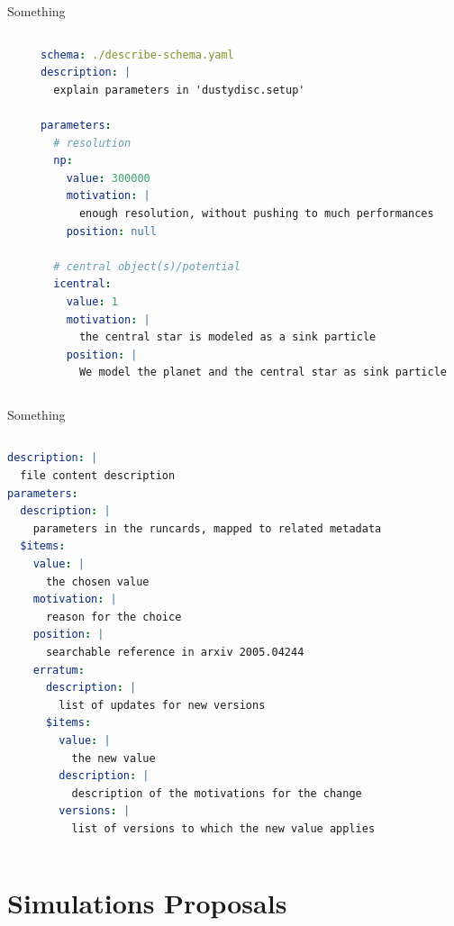 \documentclass[9pt]{beamer}
\begin{document}
\begin{frame}[fragile]{Something}
    \begin{columns}
        \begin{column}{0.5\textwidth}
        \end{column}
        \begin{column}{0.5\textwidth}
            \begin{lstlisting}[style=mystyle, language=yaml, breaklines=true]
schema: ./describe-schema.yaml
description: |
  explain parameters in 'dustydisc.setup'

parameters:
  # resolution
  np:
    value: 300000
    motivation: |
      enough resolution, without pushing to much performances
    position: null

  # central object(s)/potential
  icentral:
    value: 1
    motivation: |
      the central star is modeled as a sink particle
    position: |
      We model the planet and the central star as sink particle
\end{lstlisting}
        \end{column}
    \end{columns}
\end{frame}

\begin{frame}[fragile]{Something}
    \begin{columns}
        \begin{column}{0.5\textwidth}
            \begin{lstlisting}[language=yaml, style=mystyle, breaklines=true]
description: |
  file content description
parameters:
  description: |
    parameters in the runcards, mapped to related metadata
  $items:
    value: |
      the chosen value
    motivation: |
      reason for the choice
    position: |
      searchable reference in arxiv 2005.04244
    erratum:
      description: |
        list of updates for new versions
      $items:
        value: |
          the new value
        description: |
          description of the motivations for the change
        versions: |
          list of versions to which the new value applies
\end{lstlisting}
        \end{column}
        \begin{column}{0.5\textwidth}
        \end{column}
    \end{columns}
\end{frame}

\section{Simulations Proposals}
\end{document}
